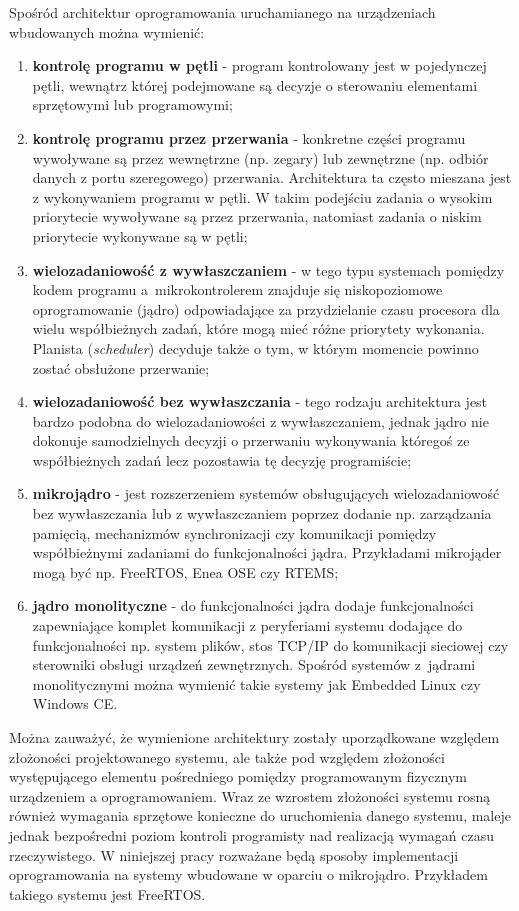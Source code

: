 \label{ref:architektury}
Spośród architektur oprogramowania uruchamianego na urządzeniach wbudowanych można wymienić:
\begin{enumerate}
\item \textbf{kontrolę programu w pętli} -
program kontrolowany jest w pojedynczej pętli, wewnątrz której podejmowane są decyzje o sterowaniu elementami sprzętowymi lub programowymi;
\item \textbf{kontrolę programu przez przerwania} - 
konkretne części programu wywoływane są przez wewnętrzne (np. zegary) lub zewnętrzne (np. odbiór danych z portu szeregowego) przerwania.
Architektura ta często mieszana jest z wykonywaniem programu w pętli. W takim podejściu zadania o wysokim priorytecie wywoływane są przez przerwania, natomiast zadania o niskim priorytecie wykonywane są w pętli;
\item \textbf{wielozadaniowość z wywłaszczaniem} - 
w tego typu systemach pomiędzy kodem programu a~mikrokontrolerem znajduje się niskopoziomowe oprogramowanie (jądro) odpowiadające za przydzielanie czasu procesora dla wielu współbieżnych zadań, które mogą mieć różne priorytety wykonania. Planista (\emph{scheduler}) decyduje także o tym, w którym momencie powinno zostać obsłużone przerwanie;
\item \textbf{wielozadaniowość bez wywłaszczania} -
tego rodzaju architektura jest bardzo podobna do wielozadaniowości z wywłaszczaniem, jednak jądro nie dokonuje samodzielnych decyzji o przerwaniu wykonywania któregoś ze współbieżnych zadań lecz pozostawia tę decyzję programiście;
\item \textbf{mikrojądro} -
jest rozszerzeniem systemów obsługujących wielozadaniowość bez wywłaszczania lub z wywłaszczaniem poprzez dodanie np. zarządzania pamięcią, mechanizmów synchronizacji czy komunikacji pomiędzy współbieżnymi zadaniami do funkcjonalności jądra. Przykładami mikrojąder mogą być np. FreeRTOS, Enea OSE czy RTEMS;
\item \textbf{jądro monolityczne} -
do funkcjonalności jądra dodaje funkcjonalności zapewniające komplet komunikacji z peryferiami systemu dodające do funkcjonalności np. system plików, stos TCP/IP do komunikacji sieciowej czy sterowniki obsługi urządzeń zewnętrznych.
Spośród systemów z~jądrami monolitycznymi można wymienić takie systemy jak Embedded Linux czy Windows CE.
\end{enumerate}

Można zauważyć, że wymienione architektury zostały uporządkowane względem złożoności projektowanego systemu, ale także pod względem złożoności występującego elementu pośredniego pomiędzy programowanym fizycznym urządzeniem a oprogramowaniem. Wraz ze wzrostem złożoności systemu rosną również wymagania sprzętowe konieczne do uruchomienia danego systemu, maleje jednak bezpośredni poziom kontroli programisty nad realizacją wymagań czasu rzeczywistego.
W niniejszej pracy rozważane będą sposoby implementacji oprogramowania na systemy wbudowane w oparciu o mikrojądro. Przykładem takiego systemu jest FreeRTOS.

